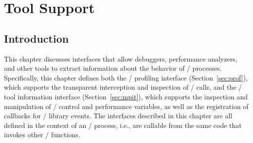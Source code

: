 \chapter{Tool Support}
\label{sec:tools}
\label{chap:tools}

\section{Introduction}

This chapter discusses interfaces that allow debuggers, performance
analyzers, and other tools to extract information about the behavior of
\MPI/ processes.  Specifically, this chapter defines both the \MPI/
profiling interface (Section~\ref{sec:prof}), which supports the
transparent interception and inspection of \MPI/ calls, and the \MPI/ tool
information interface (Section~\ref{sec:mpit}), which supports the
inspection and manipulation of \MPI/ control and performance variables,
as well as the registration of callbacks for \MPI/ library events.
The interfaces described in this chapter are all defined in the context of
an \MPI/ process, i.e., are callable from the same code that invokes other
\MPI/ functions.




